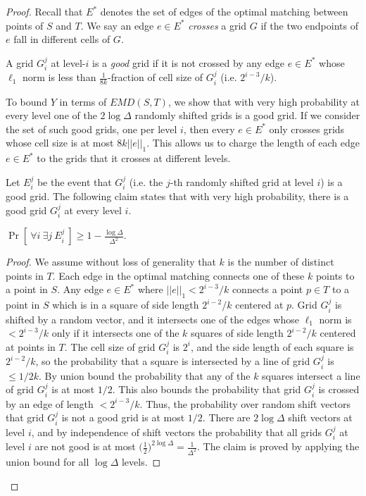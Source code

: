 \documentclass[oribibl]{llncs}
\begin{document}
\begin{proof}
Recall that $E^*$ denotes the set of edges of the optimal matching
between points of $S$ and $T$. We say an edge $e\in E^*$ \textit{crosses} a
grid $G$ if the two endpoints of $e$ fall in different cells of $G$.

\begin{definition}
A grid $G_i^j$ at level-$i$ is a \textit{good} grid if it is not
crossed by any edge $e\in E^*$ whose $\ell_1$ norm is less than
$\frac{1}{8k}$-fraction of cell
size of $G_i^j$ (i.e. $2^{i-3}/k$).
\end{definition}

To bound $Y$ in terms of $EMD(S,T)$, we show that with very high probability
at every level one of the $2\log\Delta$ randomly shifted grids is
a good grid. If we consider the set of such good grids, one per level $i$,
then every $e\in E^*$ only crosses grids whose cell size is at
most $8k||e||_1$. This allows us to charge the length of each edge $e\in E^*$ to
the grids that it crosses at different levels.

Let $E_i^j$ be the event that $G_i^j$ (i.e. the $j$-th randomly shifted grid
at level $i$) is a good grid.
The following claim states that with very high probability, there is
a good grid $G_i^j$ at every level $i$.

\begin{myclaim}\label{crossing}
$\displaystyle{\Pr[~\forall i~\exists j~ E_i^j~] \ge 1 - \frac{\log\Delta}{\Delta^2}}$.
\end{myclaim}
\begin{proof}
We assume without loss of generality that $k$ is the number of distinct points
in $T$. Each edge in the optimal matching connects one of these $k$ points to a
point in $S$. 
Any edge $e\in E^*$ where $||e||_1< 2^{i-3}/k$ connects a point $p\in T$ to a
point in $S$ which is in
a square of side length $2^{i-2}/k$ centered at $p$.
Grid $G_i^j$ is shifted by a random vector, and it intersects one of the edges
whose $\ell_1$ norm is $<2^{i-3}/k$ only if it intersects one of the $k$
squares of side length $2^{i-2}/k$ centered at points in $T$. 
The cell size of grid $G_i^j$ is $2^i$, and the side length of each square is
$2^{i-2}/k$, so the probability that a square is intersected by a line of
grid $G_i^j$ is $\le 1/2k$. By union bound the probability that
any of the $k$ squares intersect a line of grid $G_i^j$ is at most $1/2$. 
This also bounds the probability that grid $G_i^j$ is crossed by an edge of
length $<2^{i-3}/k$. Thus, the probability over random shift vectors that
grid $G_i^j$ is not a good grid is at most $1/2$.
There are $2\log\Delta$ shift vectors at level $i$, and by independence of
shift vectors the probability that all grids $G_i^j$ at level
$i$ are not good is at most 
$\big(\frac{1}{2}\big)^{2\log\Delta} = \frac{1}{\Delta^2}$.
The claim is proved by applying the union bound for all $\log\Delta$ levels.
\end{proof}


\end{proof}
\end{document}
